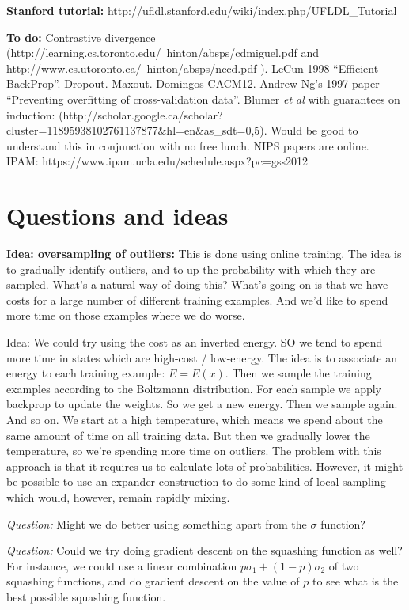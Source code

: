 \documentclass[12pt]{report}
\begin{document}
\textbf{Stanford tutorial:} http://ufldl.stanford.edu/wiki/index.php/UFLDL\_Tutorial

\textbf{To do:} Contrastive divergence
(http://learning.cs.toronto.edu/~hinton/absps/cdmiguel.pdf and
http://www.cs.utoronto.ca/~hinton/absps/nccd.pdf ). LeCun 1998
``Efficient BackProp''.  Dropout.  Maxout. Domingos CACM12.  Andrew
Ng's 1997 paper ``Preventing overfitting of cross-validation data''.
Blumer \emph{et al} with guarantees on induction:
(http://scholar.google.ca/scholar?cluster=11895938102761137877\&hl=en\&as\_sdt=0,5).
Would be good to understand this in conjunction with no free lunch.
NIPS papers are online.  IPAM: https://www.ipam.ucla.edu/schedule.aspx?pc=gss2012


\chapter{Questions and ideas}

\textbf{Idea: oversampling of outliers:} This is done using online
training.  The idea is to gradually identify outliers, and to up the
probability with which they are sampled.  What's a natural way of
doing this?  What's going on is that we have costs for a large number
of different training examples.  And we'd like to spend more time on
those examples where we do worse.  

Idea: We could try using the cost as an inverted energy.  SO we tend
to spend more time in states which are high-cost / low-energy.  The
idea is to associate an energy to each training example: $E = E(x)$.
Then we sample the training examples according to the Boltzmann
distribution.  For each sample we apply backprop to update the
weights.  So we get a new energy.  Then we sample again.  And so on.
We start at a high temperature, which means we spend about the same
amount of time on all training data.  But then we gradually lower the
temperature, so we're spending more time on outliers.  The problem
with this approach is that it requires us to calculate lots of
probabilities.  However, it might be possible to use an expander
construction to do some kind of local sampling which would, however,
remain rapidly mixing.

\emph{Question:} Might we do better using something apart from the
$\sigma$ function?

\emph{Question:} Could we try doing gradient descent on the squashing
function as well?  For instance, we could use a linear combination $p
\sigma_1+(1-p) \sigma_2$ of two squashing functions, and do gradient
descent on the value of $p$ to see what is the best possible squashing
function.
\end{document}
